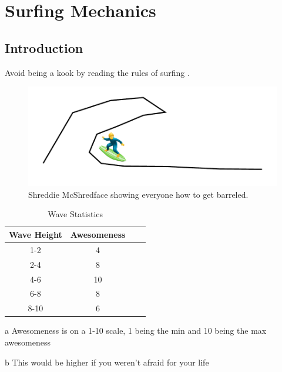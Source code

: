 \chapter{Surfing Mechanics}

\section{Introduction}

Avoid being a kook by reading the rules of surfing \cite{borte2013kook}.

\begin{figure}[hbt!]
  \includegraphics{figures/chap3/surf.pdf}
  \caption[Shreddie Getting Barreled]{Shreddie McShredface showing everyone how to get barreled.}
  \label{fig:TPM}
\end{figure}

\lipsum[2]

\begin{table}[hbt!]\centering
\captionsetup{justification=centering}
\captionsetup{width=.6\textwidth}
\captionsetup{skip=2pt}
\caption{Wave Statistics}
\renewcommand{\arraystretch}{1.5}
\begin{threeparttable}
\begin{tabular}{cccc}\toprule
  {Wave Height} & {Awesomeness\tnote{a}} \\ \midrule
    1-2 & 4\\
    2-4 & 8\\
    4-6 & 10\\
    6-8 & 8\\
    8-10 & 6\tnote{b}\\ \bottomrule
\end{tabular}
\begin{tablenotes}
\item[a] \footnotesize Awesomeness is on a 1-10 scale, 1 being the min and 10 being the max awesomeness
\item[b] \footnotesize This would be higher if you weren't afraid for your life
\end{tablenotes}
\end{threeparttable}
\end{table}
